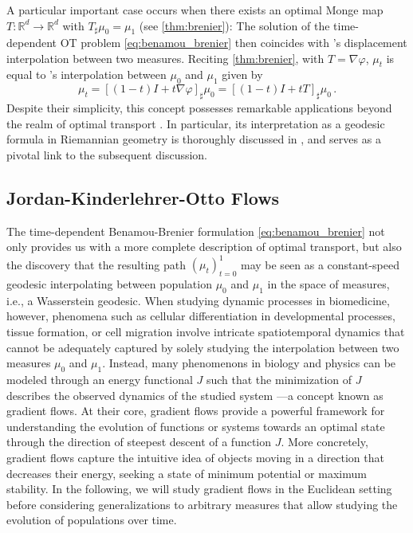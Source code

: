A particular important case occurs when there exists an optimal Monge map $T : \mathbb{R}^d \rightarrow \mathbb{R}^d$ with $T_\sharp \mu_0 = \mu_1$ (see \cref{thm:brenier}): The solution of the time-dependent OT problem \eqref{eq:benamou_brenier} then coincides with \citeauthor{mccann1997convexity}'s displacement interpolation between two measures.
Reciting \cref{thm:brenier}, with $T = \nabla \varphi$, $\mu_t$ is equal to \citeauthor{mccann1997convexity}'s interpolation between $\mu_0$ and $\mu_1$ given by
\begin{equation} \label{eq:mccann_interpolation}
	\mu_t = [(1-t) I+t \nabla \varphi]_\sharp \mu_0 = [(1-t) I+t T]_\sharp \mu_0\,.
\end{equation}
Despite their simplicity, this concept possesses remarkable applications beyond the realm of optimal transport \citep{bonneel2011displacement}. In particular, its interpretation as a geodesic formula in Riemannian geometry is thoroughly discussed in \citet{gangbo1996geometry}, and serves as a pivotal link to the subsequent discussion.


\subsection{Jordan-Kinderlehrer-Otto Flows} \label{sec:background_jko}

The time-dependent Benamou-Brenier formulation \eqref{eq:benamou_brenier} not only provides us with a more complete description of optimal transport, but also the discovery that the resulting path $(\mu_t)_{t=0}^1$ may be seen as a constant-speed geodesic interpolating between population $\mu_0$ and $\mu_1$ in the space of measures, i.e., a Wasserstein geodesic.
When studying dynamic processes in biomedicine, however, phenomena such as cellular differentiation in developmental processes, tissue formation, or cell migration involve intricate spatiotemporal dynamics that cannot be adequately captured by solely studying the interpolation between two measures $\mu_0$ and $\mu_1$.
Instead, many phenomenons in biology and physics can be modeled through an energy functional $J$ such that the minimization of $J$ describes the observed dynamics of the studied system ---a concept known as gradient flows.
At their core, gradient flows provide a powerful framework for understanding the evolution of functions or systems towards an optimal state through the direction of steepest descent of a function $J$. 
More concretely, gradient flows capture the intuitive idea of objects moving in a direction that decreases their energy, seeking a state of minimum potential or maximum stability. 
In the following, we will study gradient flows in the Euclidean setting before considering generalizations to arbitrary measures that allow studying the evolution of populations over time.

